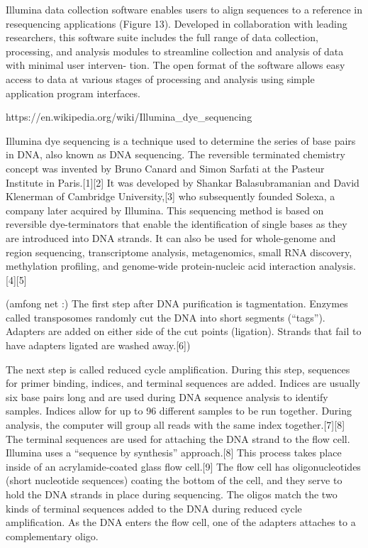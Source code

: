 Illumina data collection software enables users to align sequences to a reference in resequencing applications (Figure 13). Developed in collaboration with leading researchers, this software suite includes the full range of data collection, processing, and analysis modules to streamline collection and analysis of data with minimal user interven- tion. The open format of the software allows easy access to data at various stages of processing and analysis using simple application program interfaces.

https://en.wikipedia.org/wiki/Illumina_dye_sequencing

Illumina dye sequencing is a technique used to determine the series of base pairs in DNA, also known as DNA sequencing. The reversible terminated chemistry concept was invented by Bruno Canard and Simon Sarfati at the Pasteur Institute in Paris.[1][2] It was developed by Shankar Balasubramanian and David Klenerman of Cambridge University,[3] who subsequently founded Solexa, a company later acquired by Illumina. This sequencing method is based on reversible dye-terminators that enable the identification of single bases as they are introduced into DNA strands. It can also be used for whole-genome and region sequencing, transcriptome analysis, metagenomics, small RNA discovery, methylation profiling, and genome-wide protein-nucleic acid interaction analysis.[4][5]

(amfong net :) The first step after DNA purification is tagmentation. Enzymes called transposomes randomly cut the DNA into short segments (“tags”). Adapters are added on either side of the cut points (ligation). Strands that fail to have adapters ligated are washed away.[6])

The next step is called reduced cycle amplification. During this step, sequences for primer binding, indices, and terminal sequences are added. Indices are usually six base pairs long and are used during DNA sequence analysis to identify samples. Indices allow for up to 96 different samples to be run together. During analysis, the computer will group all reads with the same index together.[7][8] The terminal sequences are used for attaching the DNA strand to the flow cell. Illumina uses a “sequence by synthesis” approach.[8] This process takes place inside of an acrylamide-coated glass flow cell.[9] The flow cell has oligonucleotides (short nucleotide sequences) coating the bottom of the cell, and they serve to hold the DNA strands in place during sequencing. The oligos match the two kinds of terminal sequences added to the DNA during reduced cycle amplification. As the DNA enters the flow cell, one of the adapters attaches to a complementary oligo.

